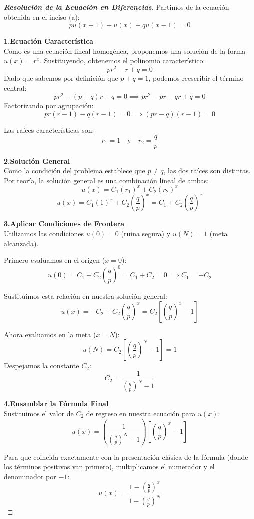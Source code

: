 \documentclass[10pt,a4paper]{article}
\begin{document}
\begin{proof}[\textbf{Resolución de la Ecuación en Diferencias}]

    Partimos de la ecuación obtenida en el inciso (a):
    \[ p u(x+1) - u(x) + q u(x-1) = 0 \]
    
    \textbf{1.Ecuación Característica} \\
    Como es una ecuación lineal homogénea, proponemos una solución de la forma $u(x) = r^x$. Sustituyendo, obtenemos el polinomio característico:
    \[ p r^2 - r + q = 0 \]
    Dado que sabemos por definición que $p + q = 1$, podemos reescribir el término central:
    \[ p r^2 - (p+q)r + q = 0 \implies p r^2 - pr - qr + q = 0 \]
    Factorizando por agrupación:
    \[ p r(r - 1) - q(r - 1) = 0 \implies (pr - q)(r - 1) = 0 \]
    
    Las raíces características son:
    \[ r_1 = 1 \quad \text{y} \quad r_2 = \frac{q}{p} \]
    
    \textbf{2.Solución General} \\
    Como la condición del problema establece que $p \neq q$, las dos raíces son distintas. Por teoría, la solución general es una combinación lineal de ambas:
    \[ u(x) = C_1(r_1)^x + C_2(r_2)^x \]
    \[ u(x) = C_1(1)^x + C_2\left(\frac{q}{p}\right)^x = C_1 + C_2\left(\frac{q}{p}\right)^x \]

    \textbf{3.Aplicar Condiciones de Frontera} \\
    Utilizamos las condiciones $u(0) = 0$ (ruina segura) y $u(N) = 1$ (meta alcanzada).
    
    Primero evaluamos en el origen ($x=0$):
    \[ u(0) = C_1 + C_2\left(\frac{q}{p}\right)^0 = C_1 + C_2 = 0 \implies C_1 = -C_2 \]
    
    Sustituimos esta relación en nuestra solución general:
    \[ u(x) = -C_2 + C_2\left(\frac{q}{p}\right)^x = C_2 \left[ \left(\frac{q}{p}\right)^x - 1 \right] \]
    
    Ahora evaluamos en la meta ($x=N$):
    \[ u(N) = C_2 \left[ \left(\frac{q}{p}\right)^N - 1 \right] = 1 \]
    Despejamos la constante $C_2$:
    \[ C_2 = \frac{1}{\left(\frac{q}{p}\right)^N - 1} \]

    \textbf{4.Ensamblar la Fórmula Final} \\
    Sustituimos el valor de $C_2$ de regreso en nuestra ecuación para $u(x)$:
    \[ u(x) = \left( \frac{1}{\left(\frac{q}{p}\right)^N - 1} \right) \left[ \left(\frac{q}{p}\right)^x - 1 \right] \]
    
    Para que coincida exactamente con la presentación clásica de la fórmula (donde los términos positivos van primero), multiplicamos el numerador y el denominador por $-1$:
    \[ u(x) = \frac{1 - \left(\frac{q}{p}\right)^x}{1 - \left(\frac{q}{p}\right)^N} \]
    
\end{proof}
\end{document}
